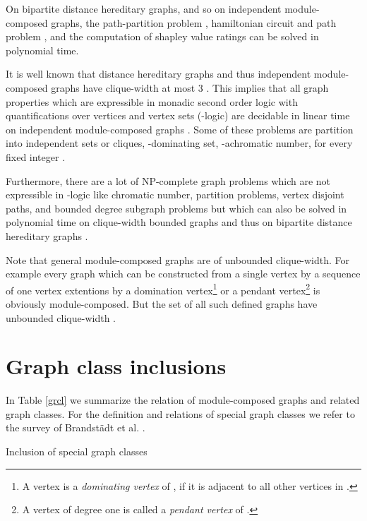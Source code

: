 \documentclass[11pt]{article}
\begin{document}
On bipartite distance hereditary graphs, and so on independent module-composed graphs, the 
path-partition problem \cite{YC98},
hamiltonian circuit and path problem \cite{MN93},
and the computation of shapley value ratings  \cite{AGKKW06}
can be solved in polynomial time.

It is well known that distance hereditary graphs and
thus independent module-composed graphs have clique-width at most 3 \cite{GR00}. This implies that
all graph properties which are expressible in monadic second order logic with
quantifications over vertices and vertex sets (-logic) are decidable in
linear time on independent module-composed graphs \cite{CMR00}. Some of these problems are
partition into  independent sets or cliques, -dominating set, -achromatic
number, for every fixed integer .

Furthermore, there are a lot of NP-complete graph problems which are not expressible in
-logic like chromatic number, partition problems,  vertex disjoint paths, and
bounded degree subgraph problems but which can also be solved in polynomial time on clique-width
bounded graphs and thus on bipartite distance hereditary graphs \cite{EGW01a,GW06}. 

Note that general module-composed graphs are of unbounded clique-width. 
For example every graph which can be constructed from a single
vertex by a sequence of one vertex extentions by a domination vertex\footnote{A vertex  is a {\em dominating vertex} of , if it is adjacent to all other vertices in .} or a
pendant vertex\footnote{A vertex  of degree one is called a {\em pendant vertex} of .} is 
obviously module-composed. But the set of all such defined graphs
have unbounded clique-width  \cite{Rao07}.


\section{Graph class inclusions}




In Table \ref{grcl} we summarize the relation of module-composed graphs
and related graph classes. For the definition and relations of special graph classes
we refer to the survey of Brandst\"adt  et al. \cite{BLS99}.

\begin{table}
\begin{center}
\caption{Inclusion of special graph classes}\label{grcl}
\end{center}
\end{table}










\end{document}
